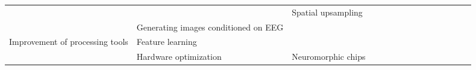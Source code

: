 \begin{tabular}{p{1.5cm}p{1.5cm}p{1.5cm}p{1.5cm}p{0.6cm}p{0.6cm}p{0.6cm}p{0.6cm}p{0.6cm}p{0.6cm}p{0.6cm}p{0.6cm}p{0.6cm}p{0.6cm}p{0.6cm}}
                                &                 & Spatial upsampling &   &                                                             &                                                                                                                             &                                                                        &                                      &                                                            &    \cite{Corley2018} &                         &                               &                     &                         &                                                                      \\
                                & Generating images conditioned on EEG &   &   &                                                             &                                                                                                                             &                                                                        &                                      &                                                            &       \cite{Lee2018} &                         &                               &  \cite{Palazzo2017} &                         &                                                                      \\
Improvement of processing tools & Feature learning &   &   &                          \cite{Wen2018, Stober2015, Li2015} &                                                                                                        \cite{Bashivan2016a} &                                                                        &                                      &                                                            &                      &                         &                               &                     &                         &                                                                      \\
                                & Hardware optimization & Neuromorphic chips &   &                                                             &                                                                                                            \cite{Nurse2016} &                                                                        &                                      &                                                            &                      &                         &              \cite{Yepes2017} &                     &                         &                                                                      \\

\end{tabular}
